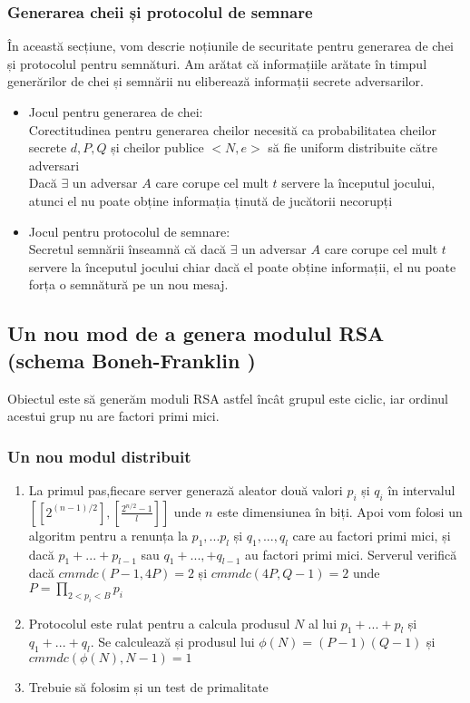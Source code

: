 \documentclass[12]{report}
\begin{document}
\subsubsection{Generarea cheii și protocolul de semnare}
În această secțiune, vom descrie noțiunile de securitate pentru generarea de chei și protocolul pentru semnături. Am arătat că informațiile arătate în timpul generărilor de chei și semnării nu eliberează informații secrete adversarilor.
\begin{itemize}
\item Jocul pentru generarea de chei: \\
Corectitudinea pentru generarea cheilor necesită ca probabilitatea cheilor secrete $d, P, Q$ și cheilor publice $<N,e>$ să fie uniform distribuite către adversari \\ 
Dacă $\exists$ un adversar $A$ care corupe cel mult $t$ servere la începutul jocului, atunci el nu poate obține informația ținută de jucătorii necorupți

\item Jocul pentru protocolul de semnare: \\
Secretul semnării înseamnă că dacă $\exists$ un adversar $A$ care corupe cel mult $t$ servere la începutul jocului chiar dacă el poate obține informații, el nu poate forța o semnătură pe un nou mesaj.
\end{itemize}


\subsection{Un nou mod de a genera modulul RSA (schema Boneh-Franklin \cite{boneh})}
Obiectul este să generăm moduli RSA astfel încât grupul este ciclic, iar ordinul acestui grup nu are factori primi mici.
\subsubsection{Un nou modul distribuit}
\begin{enumerate}

\item La primul pas,fiecare server generază aleator două valori $p_i$ și $q_i$ în intervalul $ \left[ [2^{(n-1)/2}], [\frac{2^{n/2}-1}{l}] \right]$ unde $n$ este dimensiunea în biți. Apoi vom folosi un algoritm pentru a renunța la $p_1,...p_l$ și $q_1,...,q_l$ care au factori primi mici, și dacă $p_1+...+p_{l-1}$ sau $q_1+...,+q_{l-1}$ au factori primi mici. Serverul verifică dacă $cmmdc(P-1,4P)=2$ și $cmmdc(4P,Q-1)=2$ unde $P = \prod_{2 <p_i < B} p_i$

\item Protocolul este rulat pentru a calcula produsul $N$ al lui $p_1+...+p_l$ și $q_1+...+q_l$. Se calculează și produsul lui $\phi(N)=(P-1)(Q-1)$ și $cmmdc(\phi(N),N-1)=1$

\item Trebuie să folosim și un test de primalitate
\end{enumerate}
\end{document}
